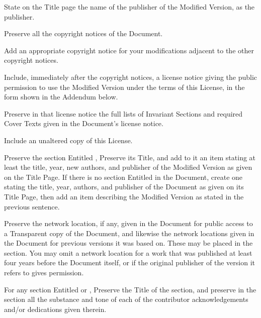 \item[C.]
   State on the Title page the name of the publisher of the
   Modified Version, as the publisher.

\item[D.]
   Preserve all the copyright notices of the Document.

\item[E.]
   Add an appropriate copyright notice for your modifications
   adjacent to the other copyright notices.

\item[F.]
   Include, immediately after the copyright notices, a license notice
   giving the public permission to use the Modified Version under the
   terms of this License, in the form shown in the Addendum below.

\item[G.]
   Preserve in that license notice the full lists of Invariant Sections
   and required Cover Texts given in the Document's license notice.

\item[H.]
   Include an unaltered copy of this License.

\item[I.]
   Preserve the section Entitled , Preserve its Title, and add
   to it an item stating at least the title, year, new authors, and
   publisher of the Modified Version as given on the Title Page.  If
   there is no section Entitled  in the Document, create one
   stating the title, year, authors, and publisher of the Document as
   given on its Title Page, then add an item describing the Modified
   Version as stated in the previous sentence.

\item[J.]
   Preserve the network location, if any, given in the Document for
   public access to a Transparent copy of the Document, and likewise
   the network locations given in the Document for previous versions
   it was based on.  These may be placed in the  section.
   You may omit a network location for a work that was published at
   least four years before the Document itself, or if the original
   publisher of the version it refers to gives permission.

\item[K.]
   For any section Entitled  or ,
   Preserve the Title of the section, and preserve in the section all
   the substance and tone of each of the contributor acknowledgements
   and/or dedications given therein.

